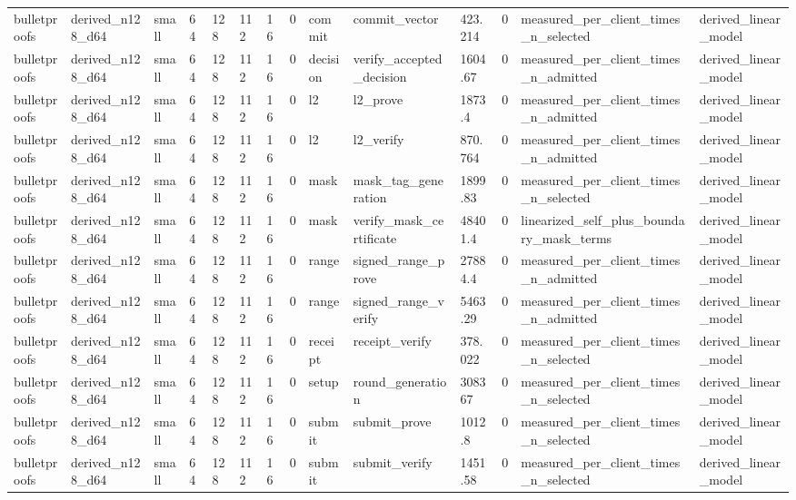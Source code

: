 \begin{table}[t]
\begin{tabular}{llllllllllllll}
bulletproofs & derived\_n128\_d64 & small & 64 & 128 & 112 & 16 & 0 & commit & commit\_vector & 423.214 & 0 & measured\_per\_client\_times\_n\_selected & derived\_linear\_model \\
bulletproofs & derived\_n128\_d64 & small & 64 & 128 & 112 & 16 & 0 & decision & verify\_accepted\_decision & 1604.67 & 0 & measured\_per\_client\_times\_n\_admitted & derived\_linear\_model \\
bulletproofs & derived\_n128\_d64 & small & 64 & 128 & 112 & 16 & 0 & l2 & l2\_prove & 1873.4 & 0 & measured\_per\_client\_times\_n\_admitted & derived\_linear\_model \\
bulletproofs & derived\_n128\_d64 & small & 64 & 128 & 112 & 16 & 0 & l2 & l2\_verify & 870.764 & 0 & measured\_per\_client\_times\_n\_admitted & derived\_linear\_model \\
bulletproofs & derived\_n128\_d64 & small & 64 & 128 & 112 & 16 & 0 & mask & mask\_tag\_generation & 1899.83 & 0 & measured\_per\_client\_times\_n\_selected & derived\_linear\_model \\
bulletproofs & derived\_n128\_d64 & small & 64 & 128 & 112 & 16 & 0 & mask & verify\_mask\_certificate & 48401.4 & 0 & linearized\_self\_plus\_boundary\_mask\_terms & derived\_linear\_model \\
bulletproofs & derived\_n128\_d64 & small & 64 & 128 & 112 & 16 & 0 & range & signed\_range\_prove & 27884.4 & 0 & measured\_per\_client\_times\_n\_admitted & derived\_linear\_model \\
bulletproofs & derived\_n128\_d64 & small & 64 & 128 & 112 & 16 & 0 & range & signed\_range\_verify & 5463.29 & 0 & measured\_per\_client\_times\_n\_admitted & derived\_linear\_model \\
bulletproofs & derived\_n128\_d64 & small & 64 & 128 & 112 & 16 & 0 & receipt & receipt\_verify & 378.022 & 0 & measured\_per\_client\_times\_n\_selected & derived\_linear\_model \\
bulletproofs & derived\_n128\_d64 & small & 64 & 128 & 112 & 16 & 0 & setup & round\_generation & 308367 & 0 & measured\_per\_client\_times\_n\_selected & derived\_linear\_model \\
bulletproofs & derived\_n128\_d64 & small & 64 & 128 & 112 & 16 & 0 & submit & submit\_prove & 1012.8 & 0 & measured\_per\_client\_times\_n\_selected & derived\_linear\_model \\
bulletproofs & derived\_n128\_d64 & small & 64 & 128 & 112 & 16 & 0 & submit & submit\_verify & 1451.58 & 0 & measured\_per\_client\_times\_n\_selected & derived\_linear\_model \\

\end{tabular}
\end{table}
